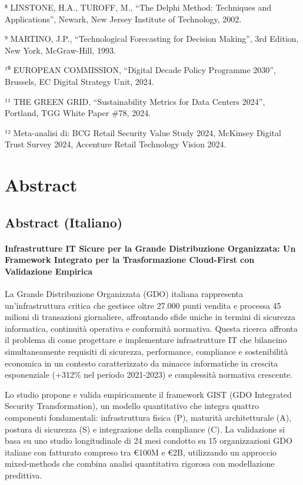 \documentclass{report}
\begin{document}
⁸ LINSTONE, H.A., TUROFF, M., ``The Delphi Method: Techniques and
Applications'', Newark, New Jersey Institute of Technology, 2002.

⁹ MARTINO, J.P., ``Technological Forecasting for Decision Making'', 3rd
Edition, New York, McGraw-Hill, 1993.

¹⁰ EUROPEAN COMMISSION, ``Digital Decade Policy Programme 2030'',
Brussels, EC Digital Strategy Unit, 2024.

¹¹ THE GREEN GRID, ``Sustainability Metrics for Data Centers 2024'',
Portland, TGG White Paper \#78, 2024.

¹² Meta-analisi di: BCG Retail Security Value Study 2024, McKinsey
Digital Trust Survey 2024, Accenture Retail Technology Vision 2024.

\chapter{Abstract}\label{abstract-1}

\section{Abstract (Italiano)}\label{abstract-italiano}

\subsubsection{Infrastrutture IT Sicure per la Grande Distribuzione
Organizzata: Un Framework Integrato per la Trasformazione Cloud-First
con Validazione
Empirica}\label{infrastrutture-it-sicure-per-la-grande-distribuzione-organizzata-un-framework-integrato-per-la-trasformazione-cloud-first-con-validazione-empirica}

La Grande Distribuzione Organizzata (GDO) italiana rappresenta
un'infrastruttura critica che gestisce oltre 27.000 punti vendita e
processa 45 milioni di transazioni giornaliere, affrontando sfide uniche
in termini di sicurezza informatica, continuità operativa e conformità
normativa. Questa ricerca affronta il problema di come progettare e
implementare infrastrutture IT che bilancino simultaneamente requisiti
di sicurezza, performance, compliance e sostenibilità economica in un
contesto caratterizzato da minacce informatiche in crescita esponenziale
(+312\% nel periodo 2021-2023) e complessità normativa crescente.

Lo studio propone e valida empiricamente il framework GIST (GDO
Integrated Security Transformation), un modello quantitativo che integra
quattro componenti fondamentali: infrastruttura fisica (P), maturità
architetturale (A), postura di sicurezza (S) e integrazione della
compliance (C). La validazione si basa su uno studio longitudinale di 24
mesi condotto su 15 organizzazioni GDO italiane con fatturato compreso
tra €100M e €2B, utilizzando un approccio mixed-methods che combina
analisi quantitativa rigorosa con modellazione predittiva.
\end{document}

